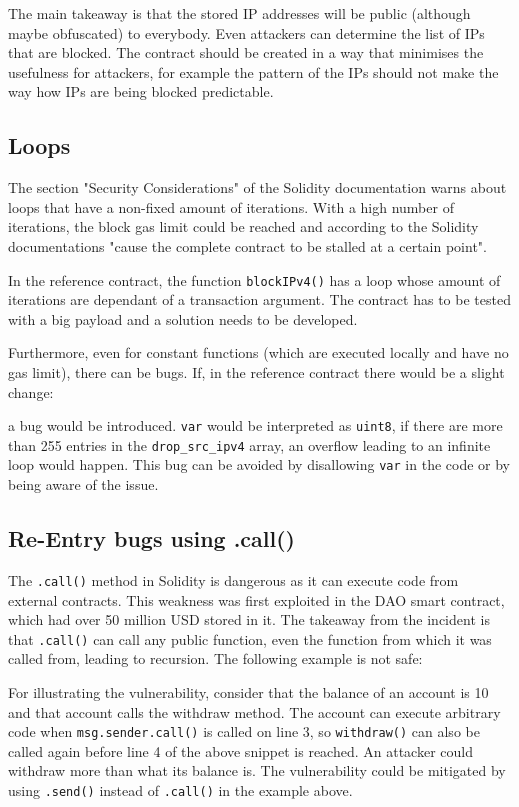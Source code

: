 The main takeaway is that the stored IP addresses will be public (although maybe obfuscated) to everybody. Even attackers can determine the list of IPs that are blocked. The contract should be created in a way that minimises the usefulness for attackers, for example the pattern of the IPs should not make the way how IPs are being blocked predictable.

\subsection{Loops}
The section "Security Considerations" of the Solidity documentation warns about loops that have a non-fixed amount of iterations. With a high number of iterations, the block gas limit could be reached and according to the Solidity documentations "cause the complete contract to be stalled at a certain point".

In the reference contract, the function \texttt{blockIPv4()} has a loop whose amount of iterations are dependant of a transaction argument. The contract has to be tested with a big payload and a solution needs to be developed.

Furthermore, even for constant functions (which are executed locally and have no gas limit), there can be bugs. If, in the reference contract there would be a slight change:



a bug would be introduced. \texttt{var} would be interpreted as \texttt{uint8}, if there are more than 255 entries in the \texttt{drop\_src\_ipv4} array, an overflow leading to an infinite loop would happen.
This bug can be avoided by disallowing \texttt{var} in the code or by being aware of the issue.

\subsection{Re-Entry bugs using .call()}

The \texttt{.call()} method in Solidity is dangerous as it can execute code from external contracts. This weakness was first exploited in the DAO smart contract, which had over 50 million USD stored in it. The takeaway from the incident is that \texttt{.call()} can call any public function, even the function from which it was called from, leading to recursion.
The following example is not safe:



For illustrating the vulnerability, consider that the balance of an account is 10 and that account calls the withdraw method. The account can execute arbitrary code when \texttt{msg.sender.call()} is called on line 3, so \texttt{withdraw()} can also be called again before line 4 of the above snippet is reached. An attacker could withdraw more than what its balance is. The vulnerability could be mitigated by using \texttt{.send()} instead of \texttt{.call()} in the example above.

